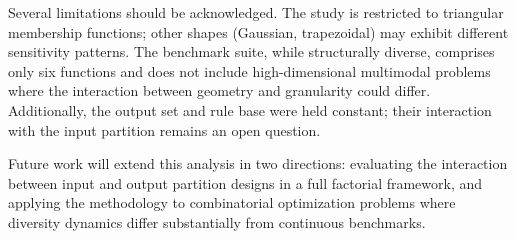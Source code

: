 Several limitations should be acknowledged. The study is restricted to triangular membership functions; other shapes (Gaussian, trapezoidal) may exhibit different sensitivity patterns. The benchmark suite, while structurally diverse, comprises only six functions and does not include high-dimensional multimodal problems where the interaction between geometry and granularity could differ. Additionally, the output set and rule base were held constant; their interaction with the input partition remains an open question.

Future work will extend this analysis in two directions: evaluating the interaction between input and output partition designs in a full factorial framework, and applying the methodology to combinatorial optimization problems where diversity dynamics differ substantially from continuous benchmarks.
